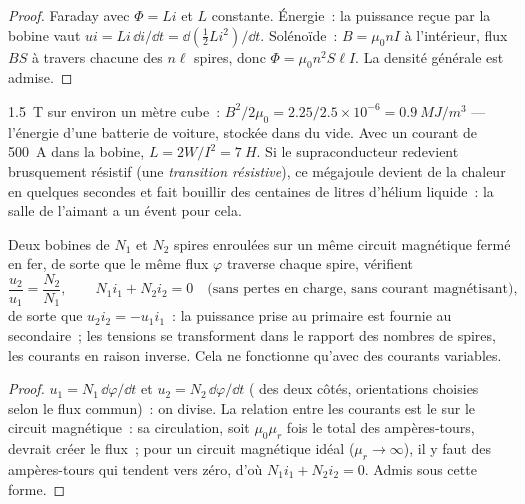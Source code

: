 \begin{proof}
Faraday avec $\Phi = Li$ et $L$ constante. Énergie~: la puissance reçue par
la bobine vaut $ui = Li\,\dd i/\dd t = \dd(\tfrac12Li^2)/\dd t$. Solénoïde~:
$B = \mu_0nI$ à l'intérieur, flux $BS$ à travers chacune des $n\ell$ spires, donc $\Phi =
\mu_0n^2S\ell I$. La densité générale est admise.
\end{proof}

\begin{example}\label{ex:b1:induction:mri}
\qty{1.5}{T} sur environ un mètre cube~: $B^2/2\mu_0 = 2.25/2.5 \times 10^{-6} =
\qty{0.9}{MJ/m^3}$ --- l'énergie d'une batterie de voiture, stockée dans du
vide. Avec un courant de \qty{500}{A} dans la bobine, $L = 2W/I^2 = \qty{7}{H}$. Si le
supraconducteur redevient brusquement résistif (une \emph{transition
résistive}), ce mégajoule devient de la chaleur en quelques secondes et fait
bouillir des centaines de litres d'hélium liquide~: la salle de l'aimant a un
évent pour cela.
\end{example}

\begin{proposition}\label{prop:b1:induction:transformer}
Deux bobines de $N_1$ et $N_2$ spires enroulées sur un même circuit magnétique
fermé en fer, de sorte que le même flux $\varphi$ traverse chaque spire, vérifient
\[
\frac{u_2}{u_1} = \frac{N_2}{N_1} , \qquad N_1i_1 + N_2i_2 = 0 \quad\text{(sans pertes en charge, sans courant magnétisant)},
\]
de sorte que $u_2i_2 = -u_1i_1$~: la puissance prise au primaire est fournie au
secondaire~; les tensions se transforment dans le rapport des nombres de
spires, les courants en raison inverse. Cela ne fonctionne qu'avec des courants variables.
\end{proposition}

\begin{proof}
$u_1 = N_1\,\dd\varphi/\dd t$ et $u_2 = N_2\,\dd\varphi/\dd t$ ( des deux côtés, orientations choisies selon le flux commun)~: on
divise. La relation entre les courants est le  sur le circuit
magnétique~: sa circulation, soit $\mu_0\mu_r$ fois le total des ampères-tours,
devrait créer le flux~; pour un circuit magnétique idéal ($\mu_r \to \infty$),
il y faut des ampères-tours qui tendent vers zéro, d'où $N_1i_1 + N_2i_2 = 0$.
Admis sous cette forme.
\end{proof}

